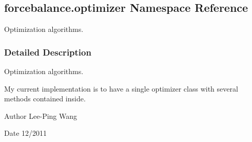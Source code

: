 \hypertarget{namespaceforcebalance_1_1optimizer}{}\subsection{forcebalance.\+optimizer Namespace Reference}
\label{namespaceforcebalance_1_1optimizer}


Optimization algorithms.  




\subsubsection{Detailed Description}
Optimization algorithms. 

My current implementation is to have a single optimizer class with several methods contained inside.

\begin{DoxyAuthor}{Author}
Lee-\/\+Ping Wang 
\end{DoxyAuthor}
\begin{DoxyDate}{Date}
12/2011 
\end{DoxyDate}
